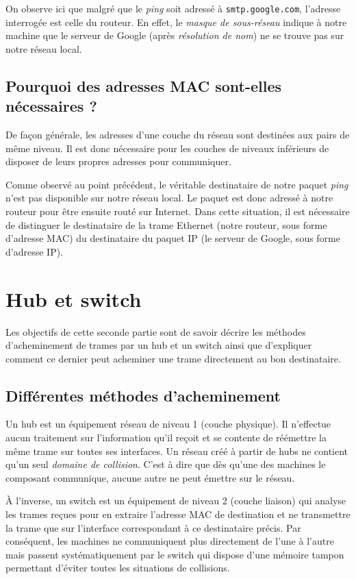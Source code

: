 \documentclass[11pt,a4paper]{article}
\begin{document}
On observe ici que malgré que le \textit{ping} soit adressé à \texttt{smtp.google.com}, l'adresse interrogée est celle du routeur. En effet, le \textit{masque de sous-réseau} indique à notre machine que le serveur de Google (après \textit{résolution de nom}) ne se trouve pas sur notre réseau local.

\subsection{Pourquoi des adresses MAC sont-elles nécessaires ?}

De façon générale, les adresses d'une couche du réseau sont destinées aux pairs de même niveau. Il est donc nécessaire pour les couches de niveaux inférieurs de disposer de leurs propres adresses pour communiquer.

Comme observé au point précédent, le véritable destinataire de notre paquet  \textit{ping} n'est pas disponible sur notre réseau local. Le paquet est donc adressé à notre routeur pour être ensuite routé sur Internet. Dans cette situation, il est nécessaire de distinguer le destinataire de la trame Ethernet (notre routeur, sous forme d'adresse MAC) du destinataire du paquet IP (le serveur de Google, sous forme d'adresse IP).

\section{Hub et switch}

Les objectifs de cette seconde partie sont de savoir décrire les méthodes d'acheminement de trames par un hub et un switch ainsi que d'expliquer comment ce dernier peut acheminer une trame directement au bon destinataire.

\subsection{Différentes méthodes d'acheminement}

Un hub est un équipement réseau de niveau 1 (couche physique). Il n'effectue aucun traitement sur l'information qu'il reçoit et se contente de réémettre la même trame sur toutes ses interfaces. Un réseau créé à partir de hubs ne contient qu'un seul \textit{domaine de collision}. C'est à dire que dès qu'une des machines le composant communique, aucune autre ne peut émettre sur le réseau.

À l'inverse, un switch est un équipement de niveau 2 (couche liaison) qui analyse les trames reçues pour en extraire l'adresse MAC de destination et ne transmettre la trame que sur l'interface correspondant à ce destinataire précis. Par conséquent, les machines ne communiquent plus directement de l'une à l'autre mais passent systématiquement par le switch qui dispose d'une mémoire tampon permettant d'éviter toutes les situations de collisions.
\end{document}
